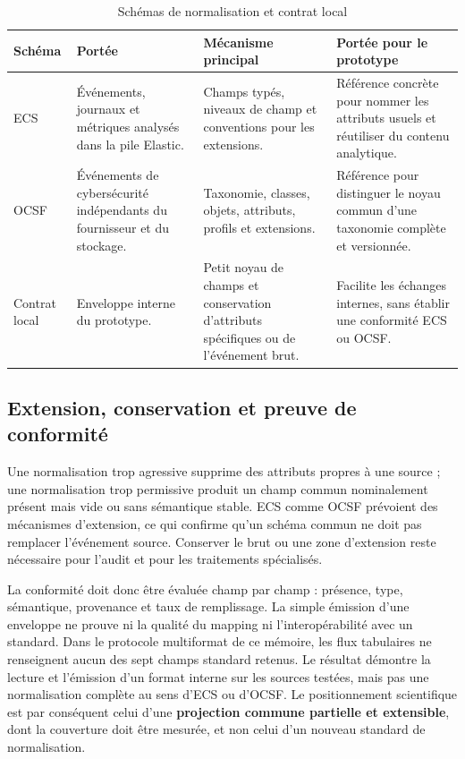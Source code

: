 \begin{table}[H]
\centering
\caption{Schémas de normalisation et contrat local}
\label{tab:schemas-normalisation}
\small
\begin{tabularx}{\textwidth}{p{2.3cm}p{3.2cm}p{3.5cm}X}
\toprule
\textbf{Schéma} & \textbf{Portée} & \textbf{Mécanisme principal} &
\textbf{Portée pour le prototype} \\
\midrule
ECS \cite{elastic2026ecs} & Événements, journaux et métriques analysés dans la pile Elastic. &
Champs typés, niveaux de champ et conventions pour les extensions. &
Référence concrète pour nommer les attributs usuels et réutiliser du contenu analytique. \\
OCSF \cite{ocsf2026schema} & Événements de cybersécurité indépendants du fournisseur et du stockage. &
Taxonomie, classes, objets, attributs, profils et extensions. &
Référence pour distinguer le noyau commun d'une taxonomie complète et versionnée. \\
Contrat local & Enveloppe interne du prototype. &
Petit noyau de champs et conservation d'attributs spécifiques ou de l'événement brut. &
Facilite les échanges internes, sans établir une conformité ECS ou OCSF. \\
\bottomrule
\end{tabularx}
\end{table}

\subsection{Extension, conservation et preuve de conformité}

Une normalisation trop agressive supprime des attributs propres à une source ; une
normalisation trop permissive produit un champ commun nominalement présent mais vide ou
sans sémantique stable. ECS comme OCSF prévoient des mécanismes d'extension, ce qui
confirme qu'un schéma commun ne doit pas remplacer l'événement source. Conserver le brut
ou une zone d'extension reste nécessaire pour l'audit et pour les traitements
spécialisés.

La conformité doit donc être évaluée champ par champ : présence, type, sémantique,
provenance et taux de remplissage. La simple émission d'une enveloppe ne prouve ni la
qualité du mapping ni l'interopérabilité avec un standard. Dans le protocole multiformat
de ce mémoire, les flux tabulaires ne renseignent aucun des sept champs standard retenus.
Le résultat démontre la lecture et l'émission d'un format interne sur les sources testées,
mais pas une normalisation complète au sens d'ECS ou d'OCSF. Le positionnement scientifique
est par conséquent celui d'une \textbf{projection commune partielle et extensible}, dont
la couverture doit être mesurée, et non celui d'un nouveau standard de normalisation.

